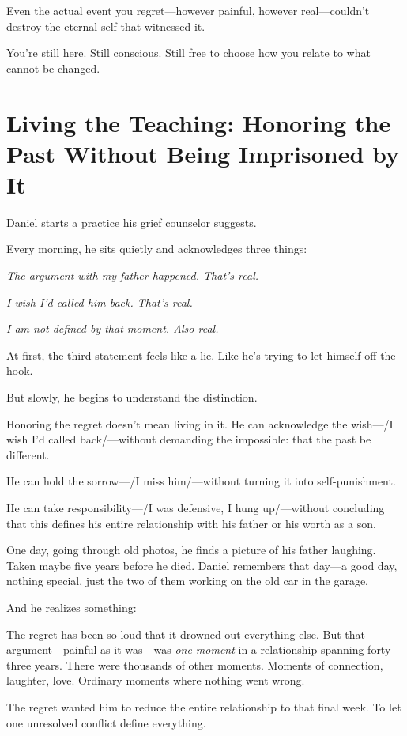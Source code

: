 \documentclass[11pt,twoside]{book}
\begin{document}
Even the actual event you regret—however painful, however real—couldn't destroy the eternal self that witnessed it.

You're still here. Still conscious. Still free to choose how you relate to what cannot be changed.

\section*{Living the Teaching: Honoring the Past Without Being Imprisoned by It}

Daniel starts a practice his grief counselor suggests.

Every morning, he sits quietly and acknowledges three things:

\emph{The argument with my father happened. That's real.}

\emph{I wish I'd called him back. That's real.}

\emph{I am not defined by that moment. Also real.}

At first, the third statement feels like a lie. Like he's trying to let himself off the hook.

But slowly, he begins to understand the distinction.

Honoring the regret doesn't mean living in it. He can acknowledge the wish—/I wish I'd called back/—without demanding the impossible: that the past be different.

He can hold the sorrow—/I miss him/—without turning it into self-punishment.

He can take responsibility—/I was defensive, I hung up/—without concluding that this defines his entire relationship with his father or his worth as a son.

One day, going through old photos, he finds a picture of his father laughing. Taken maybe five years before he died. Daniel remembers that day—a good day, nothing special, just the two of them working on the old car in the garage.

And he realizes something:

The regret has been so loud that it drowned out everything else. But that argument—painful as it was—was \emph{one moment} in a relationship spanning forty-three years. There were thousands of other moments. Moments of connection, laughter, love. Ordinary moments where nothing went wrong.

The regret wanted him to reduce the entire relationship to that final week. To let one unresolved conflict define everything.
\end{document}
